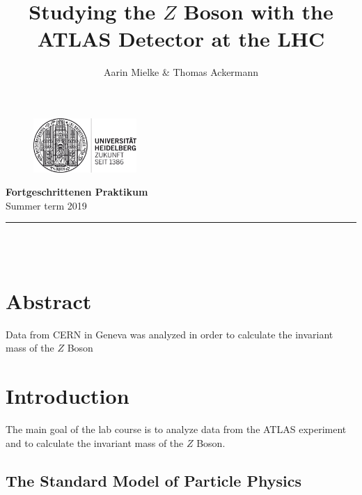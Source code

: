 \documentclass[12pt, a4paper, bibliography=totoc]{scrreprt}
\title{Studying the $Z$ Boson with the ATLAS Detector at the LHC}
\author{Aarin Mielke \& Thomas Ackermann}
\begin{document}
\begin{center}
	\makeatletter
	\thispagestyle{empty}
	
	\begin{figure}[H]
	\flushright
	\includegraphics[width=0.35\textwidth]{fig/logo}
	\end{figure}
	
	\vspace{-30mm}
	
	\begin{flushleft}
	\large{\textbf{Fortgeschrittenen Praktikum} \\
		Summer term 2019} \\
	\end{flushleft}
	
	\vspace{5mm}
	
	\rule{\textwidth}{0.2pt}

	\vspace{50mm}
	\Huge\textbf{\@title} \\
	\vspace{10mm}
	\large{\@author} \\
	\normalfont
	
	\vspace{2mm}
	
	\makeatother
\end{center}

\normalsize
\newpage


\chapter*{Abstract}

Data from CERN in Geneva was analyzed in order to calculate the invariant mass of the $Z$ Boson

\tableofcontents


\chapter{Introduction}

The main goal of the lab course is to analyze data from the ATLAS experiment and 
to calculate the invariant mass of the $Z$ Boson. 

\section{The Standard Model of Particle Physics}
\end{document}
